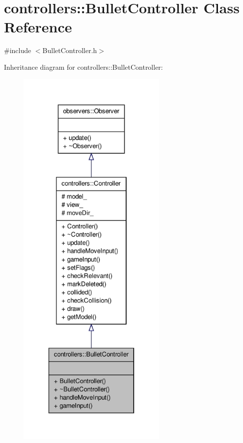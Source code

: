 \hypertarget{classcontrollers_1_1BulletController}{\section{controllers\-:\-:\-Bullet\-Controller \-Class \-Reference}
\label{da/d3c/classcontrollers_1_1BulletController}
}


{\ttfamily \#include $<$\-Bullet\-Controller.\-h$>$}



\-Inheritance diagram for controllers\-:\-:\-Bullet\-Controller\-:\nopagebreak
\begin{figure}[H]
\begin{center}
\leavevmode
\includegraphics[height=550pt]{da/d28/classcontrollers_1_1BulletController__inherit__graph}
\end{center}
\end{figure}


